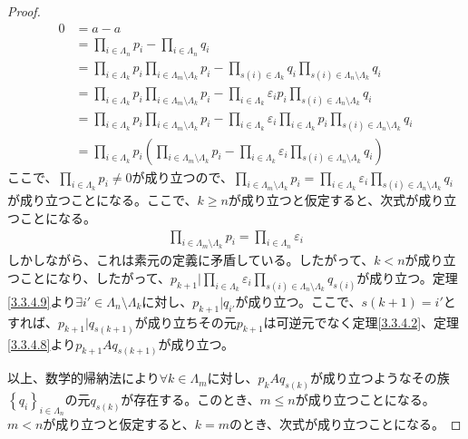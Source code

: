 \documentclass[dvipdfmx]{jsarticle}
\begin{document}
\begin{proof}
\begin{align*}
0 &= a - a\\
&= \prod_{i \in \varLambda_{n}} p_{i} - \prod_{i \in \varLambda_{n}} q_{i}\\
&= \prod_{i \in \varLambda_{k}} p_{i}\prod_{i \in \varLambda_{m} \setminus \varLambda_{k}} p_{i} - \prod_{s(i) \in \varLambda_{k}} q_{i}\prod_{s(i) \in \varLambda_{n} \setminus \varLambda_{k}} q_{i}\\
&= \prod_{i \in \varLambda_{k}} p_{i}\prod_{i \in \varLambda_{m} \setminus \varLambda_{k}} p_{i} - \prod_{i \in \varLambda_{k}} {\varepsilon_{i}p_{i}}\prod_{s(i) \in \varLambda_{n} \setminus \varLambda_{k}} q_{i}\\
&= \prod_{i \in \varLambda_{k}} p_{i}\prod_{i \in \varLambda_{m} \setminus \varLambda_{k}} p_{i} - \prod_{i \in \varLambda_{k}} \varepsilon_{i}\prod_{i \in \varLambda_{k}} p_{i}\prod_{s(i) \in \varLambda_{n} \setminus \varLambda_{k}} q_{i}\\
&= \prod_{i \in \varLambda_{k}} p_{i}\left( \prod_{i \in \varLambda_{m} \setminus \varLambda_{k}} p_{i} - \prod_{i \in \varLambda_{k}} \varepsilon_{i}\prod_{s(i) \in \varLambda_{n} \setminus \varLambda_{k}} q_{i} \right)
\end{align*}
ここで、$\prod_{i \in \varLambda_{k}} p_{i} \neq 0$が成り立つので、$\prod_{i \in \varLambda_{m} \setminus \varLambda_{k}} p_{i} = \prod_{i \in \varLambda_{k}} \varepsilon_{i}\prod_{s(i) \in \varLambda_{n} \setminus \varLambda_{k}} q_{i}$が成り立つことになる。ここで、$k \geq n$が成り立つと仮定すると、次式が成り立つことになる。
\begin{align*}
\prod_{i \in \varLambda_{m} \setminus \varLambda_{k}} p_{i} = \prod_{i \in \varLambda_{n}} \varepsilon_{i}
\end{align*}
しかしながら、これは素元の定義に矛盾している。したがって、$k < n$が成り立つことになり、したがって、$p_{k + 1}|\prod_{i \in \varLambda_{k}} \varepsilon_{i}\prod_{s(i) \in \varLambda_{n} \setminus \varLambda_{k}} q_{s(i)}$が成り立つ。定理\ref{3.3.4.9}より$\exists i' \in \varLambda_{n} \setminus \varLambda_{k}$に対し、$p_{k + 1}|q_{i'}$が成り立つ。ここで、$s(k + 1) = i'$とすれば、$p_{k + 1}|q_{s(k + 1)}$が成り立ちその元$p_{k + 1}$は可逆元でなく定理\ref{3.3.4.2}、定理\ref{3.3.4.8}より$p_{k + 1}Aq_{s(k + 1)}$が成り立つ。\par
以上、数学的帰納法により$\forall k \in \varLambda_{m}$に対し、$p_{k}Aq_{s(k)}$が成り立つようなその族$\left\{ q_{i} \right\}_{i \in \varLambda_{n}}$の元$q_{s(k)}$が存在する。このとき、$m \leq n$が成り立つことになる。$m < n$が成り立つと仮定すると、$k = m$のとき、次式が成り立つことになる。

\end{proof}
\end{document}
